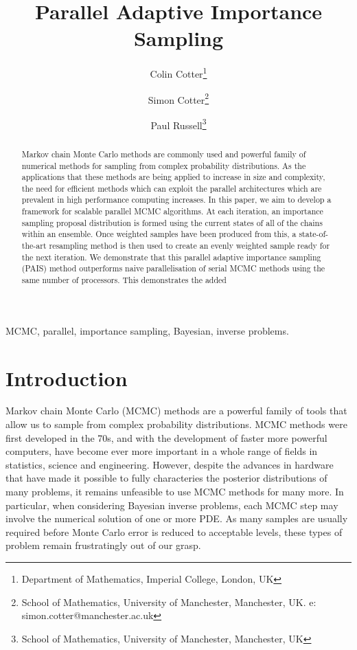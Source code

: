 \documentclass[final]{siamltex}
\author{Colin Cotter\thanks{Department of Mathematics, Imperial
    College, London, UK} \and Simon Cotter\thanks{School of
    Mathematics, University of Manchester, Manchester, UK. e: simon.cotter@manchester.ac.uk} \and Paul Russell\thanks{School of
    Mathematics, University of Manchester, Manchester, UK}}
\title{Parallel Adaptive Importance Sampling}
\begin{document}
\maketitle
\begin{abstract}
  Markov chain Monte Carlo methods are commonly used and powerful
  family of numerical methods for sampling from complex probability
  distributions. As the applications that these methods are being
  applied to increase in size and complexity, the need for efficient
  methods which can exploit the parallel architectures which are
  prevalent in high performance computing increases. In this paper, we
  aim to develop a framework for scalable parallel MCMC algorithms. At
  each iteration, an importance sampling proposal distribution is
  formed using the current states of all of the chains within an
  ensemble. Once weighted samples have been produced from this, a
  state-of-the-art resampling method is then used to create an evenly
  weighted sample ready for the next iteration. We demonstrate that
  this parallel adaptive importance sampling (PAIS) method outperforms
  naive parallelisation of serial MCMC methods using the same number
  of processors. This demonstrates the added
\end{abstract}
\begin{keywords}MCMC, parallel, importance sampling, Bayesian, inverse problems.
\end{keywords}
\section{Introduction}
Markov chain Monte Carlo (MCMC) methods are a powerful family of tools
that allow us to sample from complex probability distributions. MCMC
methods were first developed in the 70s\cite{hastings1970monte}, and with the development of
faster more powerful computers, have become ever more important in a
whole range of fields in statistics, science and engineering. However,
despite the advances in hardware that have made it possible to fully
characteries the posterior distributions of many problems, it remains
unfeasible to use MCMC methods for many more. In particular, when
considering Bayesian inverse problems, each MCMC step may involve the
numerical solution of one or more PDE. As many samples are usually
required before Monte Carlo error is reduced to acceptable levels,
these types of problem remain frustratingly out of our grasp.
\end{document}
